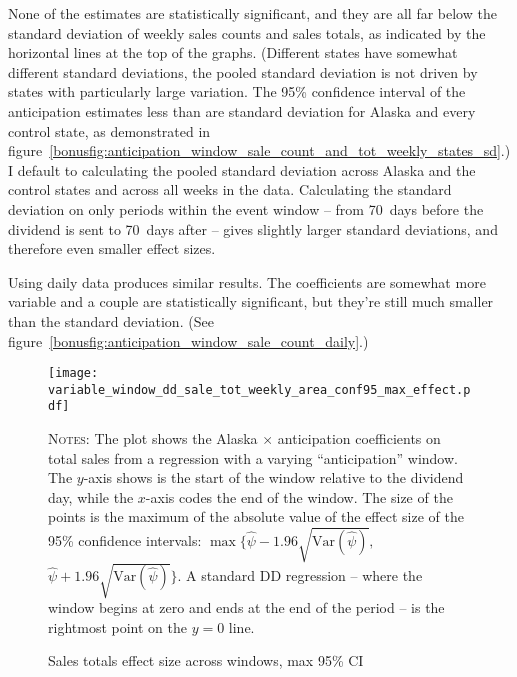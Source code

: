 \documentclass[11pt,letterpaper,oneside]{article}
\newcommand{\Var}{\text{Var}}
\begin{document}
None of the estimates are statistically significant, and they are all far below the standard deviation of weekly sales counts and sales totals, as indicated by the horizontal lines at the top of the graphs.
(Different states have somewhat different standard deviations, the pooled standard deviation is not driven by states with particularly large variation.
The 95\% confidence interval of the anticipation estimates less than are standard deviation for Alaska and every control state, as demonstrated in figure~\ref{bonusfig:anticipation_window_sale_count_and_tot_weekly_states_sd}.)
I default to calculating the pooled standard deviation across Alaska and the control states and across all weeks in the data.
Calculating the standard deviation on only periods within the event window -- from 70~days before the dividend is sent to 70~days after -- gives slightly larger standard deviations, and therefore even smaller effect sizes.

Using daily data produces similar results.
The coefficients are somewhat more variable and a couple are statistically significant, but they're still much smaller than the standard deviation.
(See figure~\ref{bonusfig:anticipation_window_sale_count_daily}.)


\begin{figure}[hbt]
     \caption{Sales totals effect size across windows, max 95\% CI}
     \label{fig:variable_window_sale_tot_conf95_max_effect}
        \texttt{[image: variable\_window\_dd\_sale\_tot\_weekly\_area\_conf95\_max\_effect.pdf]}

    {\footnotesize
    \textsc{Notes:} The plot shows the Alaska $\times$ anticipation coefficients on total sales from a regression with a varying ``anticipation'' window.
    The $y$-axis shows is the start of the window relative to the dividend day, while the $x$-axis codes the end of the window.
    The size of the points is the maximum of the absolute value of the effect size of the 95\% confidence intervals: $\max \big\{ \hat{\psi} - 1.96 \sqrt{\Var(\hat{\psi})},$ $ \hat{\psi} + 1.96 \sqrt{\Var(\hat{\psi})} \big\}$.
    A standard DD regression -- where the window begins at zero and ends at the end of the period -- is the rightmost point on the $y=0$ line.
    }
\end{figure}
\end{document}
